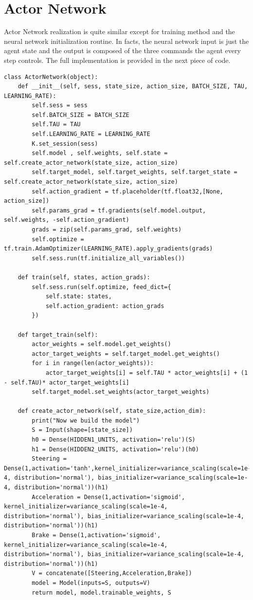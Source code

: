 \documentclass[Lau,oneside,noexaminfo]{sapthesis} %
\begin{document}
\section{Actor Network}
Actor Network realization is quite similar except for training method and the neural network initialization routine. In facts, the neural network input is just the agent state and the output is composed of the three commands the agent every step controls. The full implementation is provided in the next piece of code.
\clearpage
\begin{lstlisting}
class ActorNetwork(object):
    def __init__(self, sess, state_size, action_size, BATCH_SIZE, TAU, LEARNING_RATE):
        self.sess = sess
        self.BATCH_SIZE = BATCH_SIZE
        self.TAU = TAU
        self.LEARNING_RATE = LEARNING_RATE
        K.set_session(sess)
        self.model , self.weights, self.state = self.create_actor_network(state_size, action_size)   
        self.target_model, self.target_weights, self.target_state = self.create_actor_network(state_size, action_size) 
        self.action_gradient = tf.placeholder(tf.float32,[None, action_size])
        self.params_grad = tf.gradients(self.model.output, self.weights, -self.action_gradient)
        grads = zip(self.params_grad, self.weights)
        self.optimize = tf.train.AdamOptimizer(LEARNING_RATE).apply_gradients(grads)
        self.sess.run(tf.initialize_all_variables())

    def train(self, states, action_grads):
        self.sess.run(self.optimize, feed_dict={
            self.state: states,
            self.action_gradient: action_grads
        })

    def target_train(self):
        actor_weights = self.model.get_weights()
        actor_target_weights = self.target_model.get_weights()
        for i in range(len(actor_weights)):
            actor_target_weights[i] = self.TAU * actor_weights[i] + (1 - self.TAU)* actor_target_weights[i]
        self.target_model.set_weights(actor_target_weights)

    def create_actor_network(self, state_size,action_dim):
        print("Now we build the model")
        S = Input(shape=[state_size])   
        h0 = Dense(HIDDEN1_UNITS, activation='relu')(S)
        h1 = Dense(HIDDEN2_UNITS, activation='relu')(h0)
        Steering = Dense(1,activation='tanh',kernel_initializer=variance_scaling(scale=1e-4, distribution='normal'), bias_initializer=variance_scaling(scale=1e-4, distribution='normal'))(h1)
        Acceleration = Dense(1,activation='sigmoid', kernel_initializer=variance_scaling(scale=1e-4, distribution='normal'), bias_initializer=variance_scaling(scale=1e-4, distribution='normal'))(h1)
        Brake = Dense(1,activation='sigmoid', kernel_initializer=variance_scaling(scale=1e-4, distribution='normal'), bias_initializer=variance_scaling(scale=1e-4, distribution='normal'))(h1) 
        V = concatenate([Steering,Acceleration,Brake])          
        model = Model(inputs=S, outputs=V)
        return model, model.trainable_weights, S
\end{lstlisting}
\end{document}
